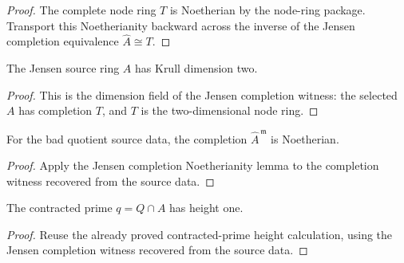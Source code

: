 \begin{proof}
  The complete node ring \(T\) is Noetherian by the node-ring package.
  Transport this Noetherianity backward across the inverse of the Jensen
  completion equivalence \(\widehat A\cong T\).
\end{proof}

\begin{lemma}
  \label{lem:bad_quotient_source_data_source_ring_krull_dim_eq_two}
  The Jensen source ring \(A\) has Krull dimension two.
\end{lemma}

\begin{proof}
  This is the dimension field of the Jensen completion witness: the selected
  \(A\) has completion \(T\), and \(T\) is the two-dimensional node ring.
\end{proof}

\begin{lemma}
  \label{lem:bad_quotient_source_data_adic_completion_is_noetherian_ring}
  For the bad quotient source data, the completion
  \(\widehat A^{\,\mathfrak m}\) is Noetherian.
\end{lemma}

\begin{proof}
  Apply the Jensen completion Noetherianity lemma to the completion witness
  recovered from the source data.
\end{proof}

\begin{lemma}
  \label{lem:bad_quotient_source_data_q_height_one_source}
  The contracted prime \(q=Q\cap A\) has height one.
\end{lemma}

\begin{proof}
  Reuse the already proved contracted-prime height calculation, using the
  Jensen completion witness recovered from the source data.
\end{proof}

